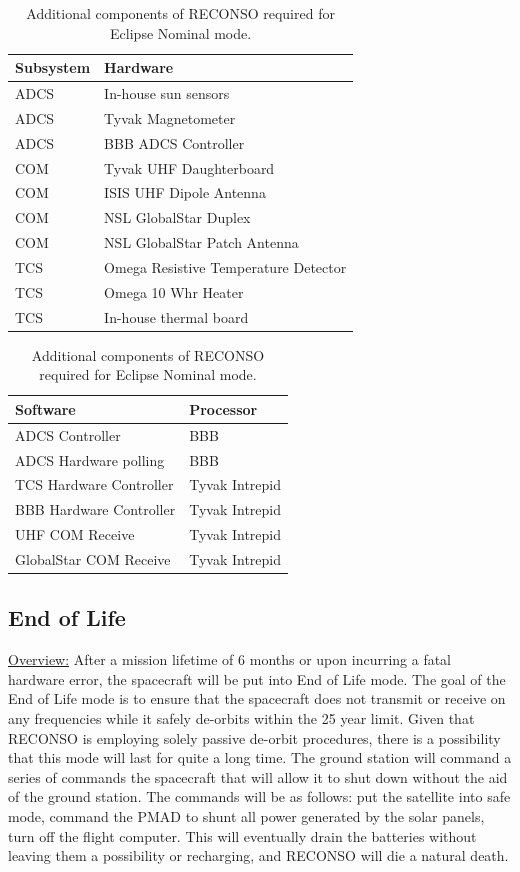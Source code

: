 \documentclass{article}
\begin{document}
\begin{table}[h!]
\caption{Additional components of RECONSO required for Eclipse Nominal mode.}
\begin{adjustbox}{center}
\begin{tabular}{|l|l|}
\hline
Subsystem & Hardware \\ \hline \hline
ADCS & In-house sun sensors  \\ \hline
ADCS & Tyvak Magnetometer \\ \hline
ADCS & BBB ADCS Controller \\ \hline \hline
COM & Tyvak UHF Daughterboard  \\ \hline
COM & ISIS UHF Dipole Antenna  \\ \hline
COM & NSL GlobalStar Duplex  \\ \hline
COM & NSL GlobalStar Patch Antenna \\ \hline \hline
TCS & Omega Resistive Temperature Detector \\ \hline
TCS & Omega 10 Whr Heater  \\ \hline
TCS & In-house thermal board \\ \hline
\end{tabular}

\quad

\begin{tabular}{|l|l|}
\hline
Software & Processor \\ \hline \hline
ADCS Controller & BBB \\ \hline
ADCS Hardware polling & BBB \\ \hline \hline
TCS Hardware Controller & Tyvak Intrepid \\ \hline
BBB Hardware Controller & Tyvak Intrepid \\ \hline
UHF COM Receive & Tyvak Intrepid \\ \hline
GlobalStar COM Receive & Tyvak Intrepid \\ \hline
\end{tabular}
\end{adjustbox}
\end{table}

\newpage

\subsection{End of Life}

\underline{Overview:} After a mission lifetime of 6 months or upon incurring a fatal hardware error, the spacecraft will be put into End of Life mode. The goal of the End of Life mode is to ensure that the spacecraft does not transmit or receive on any frequencies while it safely de-orbits within the 25 year limit. Given that RECONSO is employing solely passive de-orbit procedures, there is a possibility that this mode will last for quite a long time. The ground station will command a series of commands the spacecraft that will allow it to shut down without the aid of the ground station. The commands will be as follows: put the satellite into safe mode, command the PMAD to shunt all power generated by the solar panels, turn off the flight computer. This will eventually drain the batteries without leaving them a possibility or recharging, and RECONSO will die a natural death. 
\end{document}
